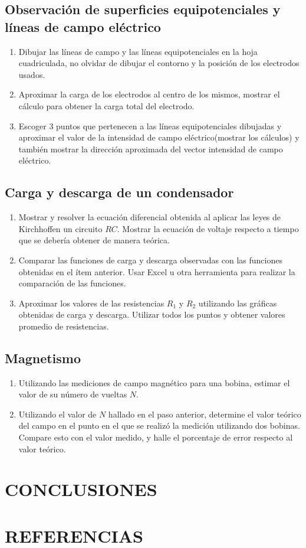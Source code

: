\documentclass[10pt, twoside]{article}
\begin{document}
\subsection{Observación de superficies equipotenciales y líneas de campo eléctrico}
\begin{enumerate}[label=\roman*.]
	\item Dibujar las líneas de campo y las líneas equipotenciales en la hoja cuadriculada,
		no olvidar de dibujar el contorno y la posición de los electrodos usados.
	\item Aproximar la carga de los electrodos al centro de los mismos,
		mostrar el cálculo para obtener la carga total del electrodo.
	\item Escoger 3 puntos que pertenecen a las líneas equipotenciales dibujadas y aproximar el valor
		de la intensidad de campo eléctrico(mostrar los cálculos)
		y también mostrar la dirección aproximada del vector intensidad de campo eléctrico.
\end{enumerate}

\subsection{Carga y descarga de un condensador}
\begin{enumerate}[label=\roman*.]
	\item Mostrar y resolver la ecuación diferencial obtenida al aplicar las leyes de Kirchhoffen un circuito $RC$.
		Mostrar la ecuación de voltaje respecto a tiempo que se debería obtener de manera teórica.
	\item Comparar las funciones de carga y descarga observadas con las funciones obtenidas en el ítem anterior.
		Usar Excel u otra herramienta para realizar la comparación de  las funciones.
	\item Aproximar los valores de las resistencias $R_1$ y $R_2$ utilizando las gráficas obtenidas de carga y descarga.
		Utilizar todos los puntos y obtener valores promedio de resistencias.
\end{enumerate}
\subsection{Magnetismo}
\begin{enumerate}[label=\roman*.]
	\item Utilizando las mediciones de campo magnético para una bobina,
		estimar el valor de su número de vueltas $N$.
	\item Utilizando el valor de $N$ hallado en el paso anterior,
		determine el valor teórico del campo en el punto en el que se realizó la medición utilizando dos bobinas.
		Compare esto con el valor medido, y halle el porcentaje de error respecto al valor teórico.
\end{enumerate}
\section{CONCLUSIONES}
\section{REFERENCIAS}
\end{document}
